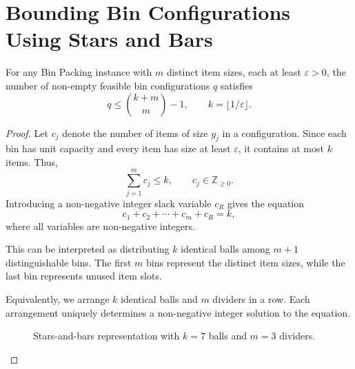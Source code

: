 
\section{Bounding Bin Configurations Using Stars and Bars}
\label{app:bounded-config}

\begin{lemma}
\label{lem:bounded-config}
    For any Bin Packing instance with $m$ distinct
    item sizes, each at least $\varepsilon>0$,
    the number of non-empty feasible bin configurations
    $q$ satisfies
    \[
        q\leq \binom{k+m}{m}-1,
        \qquad k=\lfloor 1/\varepsilon\rfloor.
    \]
\end{lemma}

\begin{proof}
Let $c_j$ denote the number of items of size
$y_j$ in a configuration. Since each bin has unit
capacity and every item has size at least $\varepsilon$,
it contains at most $k$ items. Thus,
\[
    \sum_{j=1}^{m}c_j\leq k,
    \qquad c_j\in\mathbb{Z}_{\geq 0}.
\]
Introducing a non-negative integer slack variable
$c_R$ gives the equation
\[
    c_1+c_2+\cdots+c_m+c_R=k,
\]
where all variables are non-negative integers.

This can be interpreted as distributing $k$
identical balls among $m+1$ distinguishable
bins. The first $m$ bins represent the distinct
item sizes, while the last bin represents
unused item slots.

Equivalently, we arrange $k$ identical balls
and $m$ dividers in a row. Each arrangement
uniquely determines a non-negative integer
solution to the equation.

\begin{figure}[htbp]
    \centering
    \caption{Stars-and-bars representation with
    $k=7$ balls and $m=3$ dividers.}
    \label{fig:stars-bars}
\end{figure}


\end{proof}
